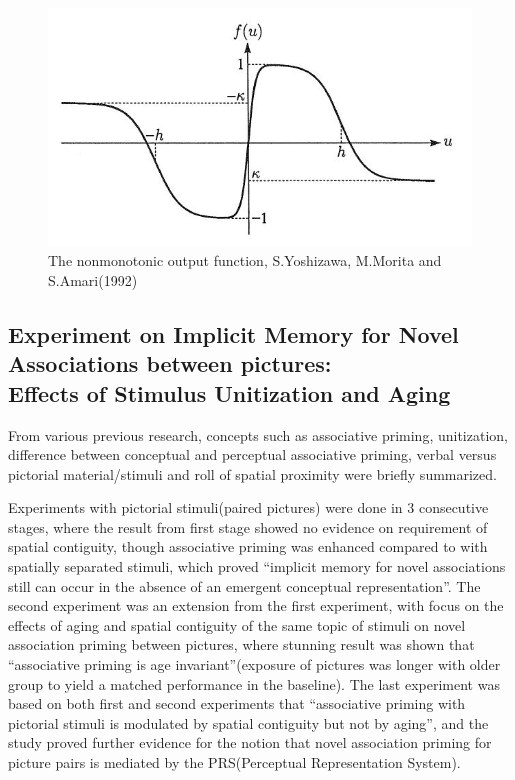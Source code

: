 \begin{figure}[htbp]
	\centering
	\includegraphics[scale = 0.8]{inc/nonmonotonic.jpg}
	\caption{The nonmonotonic output function, S.Yoshizawa, M.Morita and S.Amari(1992)}
	\label{fig:nonmonotonic}
\end{figure}

\subsection{Experiment on Implicit Memory for Novel Associations between pictures: \\ Effects of Stimulus Unitization and Aging\cite{stimulus_unitization_and_aging}}

From various previous research, concepts such as associative priming, unitization, difference between conceptual and perceptual associative priming, verbal versus pictorial material/stimuli and roll of spatial proximity were briefly summarized.

Experiments with pictorial stimuli(paired pictures) were done in 3 consecutive stages, where the result from first stage showed no evidence on requirement of spatial contiguity, though associative priming was enhanced compared to with spatially separated stimuli, which proved ``implicit memory for novel associations still can occur in the absence of an emergent conceptual representation''. The second experiment was an extension from the first experiment, with focus on the effects of aging and spatial contiguity of the same topic of stimuli on novel association priming between pictures, where stunning result was shown that ``associative priming is age invariant''(exposure of pictures was longer with older group to yield a matched performance in the baseline). The last experiment was based on both first and second experiments that ``associative priming with pictorial stimuli is modulated by spatial contiguity but not by aging'', and the study proved further evidence for the notion that novel association priming for picture pairs is mediated by the PRS(Perceptual Representation System).


%
%
%
%
